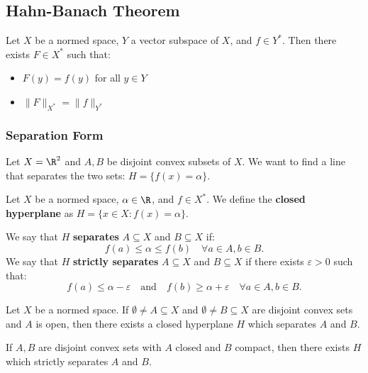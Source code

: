 \clearpage
\subsection{Hahn-Banach Theorem}

\begin{theorem}
Let $X$ be a normed space, $Y$ a vector subspace of $X$, and $f \in Y^*$. Then there exists $F \in X^*$ such that:
\begin{itemize}
\item $F(y) = f(y)$ for all $y \in Y$
\item $\|F\|_{X^*} = \|f\|_{Y^*}$
\end{itemize}
\end{theorem}

\subsubsection{Separation Form}

Let $X = \R^2$ and $A, B$ be disjoint convex subsets of $X$. We want to find a line that separates the two sets: $H = \{f(x) = \alpha\}$.

\begin{definition}
Let $X$ be a normed space, $\alpha \in \R$, and $f \in X^*$. We define the \textbf{closed hyperplane} as $H = \{x \in X : f(x) = \alpha\}$.
\end{definition}

\begin{definition}
We say that $H$ \textbf{separates} $A \subseteq X$ and $B \subseteq X$ if:
\[
f(a) \leq \alpha \leq f(b) \quad \forall a \in A, b \in B.
\]
We say that $H$ \textbf{strictly separates} $A \subseteq X$ and $B \subseteq X$ if there exists $\varepsilon > 0$ such that:
\[
f(a) \leq \alpha - \varepsilon \quad \text{and} \quad f(b) \geq \alpha + \varepsilon \quad \forall a \in A, b \in B.
\]
\end{definition}

\begin{theorem}
Let $X$ be a normed space. If $\emptyset \neq A \subseteq X$ and $\emptyset \neq B \subseteq X$ are disjoint convex sets and $A$ is open, then there exists a closed hyperplane $H$ which separates $A$ and $B$.
\end{theorem}

\begin{remark}
If $A, B$ are disjoint convex sets with $A$ closed and $B$ compact, then there exists $H$ which strictly separates $A$ and $B$.
\end{remark}

